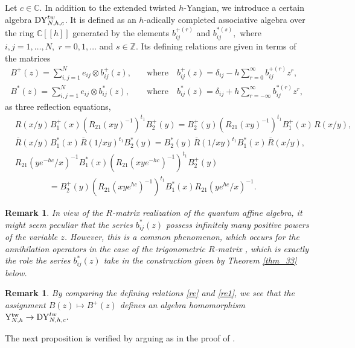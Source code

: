 \documentclass[12pt,a4paper,reqno]{amsart}
\theoremstyle{stil}
\theoremstyle{defi}
\theoremstyle{defi}
\newtheorem{rem}[thm]{Remark}
\theoremstyle{stil}
\theoremstyle{stil}
\theoremstyle{stil}
\theoremstyle{prim}
\newcommand{\wvr}{\overline}
\newcommand{\non}{\nonumber}
\newcommand{\ot}{\otimes}
\newcommand{\ts}{\hspace{1pt}}
\newcommand{\R}{\wvr{R}}
\newcommand{\yhg}{{\rm Y}_{N,h}^{\text{tw}} }
\newcommand{\dyho}{{\rm DY}_{N,h,c}^{tw}  }
\newcommand{\CC}{\mathbb{C}}
\newcommand{\ZZ}{\mathbb{Z}}
\begin{document}
Let $c\in\CC$.
In addition to the  extended twisted $h$-Yangian, we   introduce a certain algebra $\dyho $.
It is defined as 
an $h$-adically completed associative algebra over the ring $\CC[[h]]$ generated by the elements $b_{ij}^{ + (r)} $ and $b_{ij}^{ * (s)} ,$  where $i,j=1,\ldots ,N ,$   $r=0,1,\ldots $ and $s\in\ZZ .$ Its defining relations are given in terms of the matrices
\begin{align*}
B^+(z)=\sum_{i,j=1}^N e_{ij} \ot b_{ij}^+ (z),\quad&\text{where}\quad
b_{ij}^+ (z)=\delta_{ij}- h\sum_{r=0}^\infty b_{ij}^{+ (r)} z^{   r},\\
B^*(z)=\sum_{i,j=1}^N e_{ij} \ot b_{ij}^* (z),\quad&\text{where}\quad
b_{ij}^* (z)=\delta_{ij}+ h\sum_{r=-\infty}^\infty b_{ij}^{* (r)} z^{   r},
\end{align*}
as three reflection equations,
\begin{align}
&R(x/y)\ts B_1^+(x)\left(R_{21}(xy)^{-1}\right)^{t_1}  B_2^+(y)
=
B_2^+(y)\left(R_{21}(xy)^{-1}\right)^{t_1}B_1^+(x)\ts R(x/y),\label{re1}\\
&\R(x/y)\ts B_1^*(x)\ts \R(1/xy)^{t_1}  B_2^*(y)
=
B_2^*(y)\ts \R(1/xy)^{t_1} B_1^*(x)\ts \R(x/y),\label{re2}\\ 
&R_{21}(ye^{ - hc }/x)^{-1}  B_1^*(x) \left(R_{21}(xye^{-hc })^{-1}\right)^{t_1}  B_2^+(y)\non\\
&\qquad\qquad=
B_2^+(y)\left(R_{21}(xye^{ hc })^{-1}\right)^{t_1} B_1^*(x)R_{21}(ye^{  hc}/x)^{-1} .\label{re3} 
\end{align}

\begin{rem}
In view of the $R$-matrix realization of the quantum affine algebra, it might seem peculiar that  the series $b_{ij}^*(z)$ possess infinitely many positive powers of the variable $z$. However, this is a common phenomenon, which occurs for the annihilation operators in the case of the trigonometric $R$-matrix \cite[Sect. 2.1.2]{EK}, which is exactly the role the  series $b_{ij}^*(z)$ take in the construction given by Theorem \ref{thm_33} below.
\end{rem}

\begin{rem}
By comparing the defining relations   \eqref{re}   and \eqref{re1}, we see that the  
assignment $B(z)\mapsto B^+(z)$ defines an algebra homomorphism $\yhg\to\dyho.$
\end{rem}

The next proposition is verified by arguing as in the proof of \cite[Prop. 4.20]{JZ}.
\end{document}
